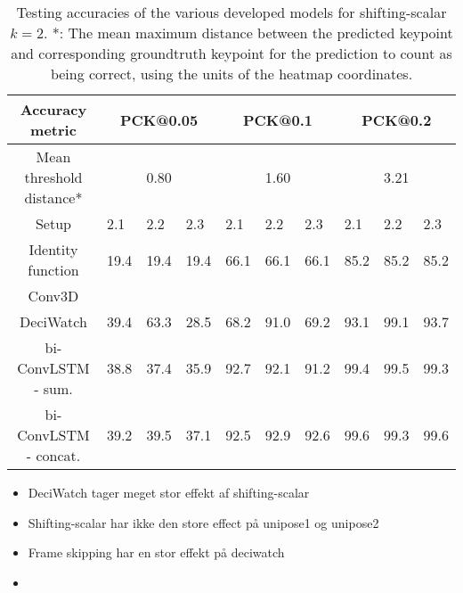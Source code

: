 \documentclass[./main.tex]{subfiles}
\begin{document}
\begin{table}[htbp]
    \begin{tabular}{c||lll|lll|lll}
        \hline
        Accuracy metric & \multicolumn{3}{c}{PCK@0.05} & \multicolumn{3}{c}{PCK@0.1} & \multicolumn{3}{c}{PCK@0.2} \\
        \hline
        Mean threshold distance* & \multicolumn{3}{c}{0.80} & \multicolumn{3}{c}{1.60} & \multicolumn{3}{c}{3.21} \\
        \hline
        Setup & 2.1 & 2.2 & 2.3 & 2.1 & 2.2 & 2.3 & 2.1 & 2.2 & 2.3 \\
        \hline
        \hline
        Identity function & 19.4 & 19.4 & 19.4 & 66.1 & 66.1 & 66.1 & 85.2 & 85.2 & 85.2 \\
        Conv3D & & & & & & & & & \\
        DeciWatch & 39.4 & 63.3 & 28.5 & 68.2 & 91.0 & 69.2 & 93.1 & 99.1 & 93.7 \\
        bi-ConvLSTM - sum. & 38.8 & 37.4 & 35.9 & 92.7 & 92.1 & 91.2 & 99.4 & 99.5 & 99.3 \\
        bi-ConvLSTM - concat. & 39.2 & 39.5 & 37.1 & 92.5 & 92.9 & 92.6 & 99.6 & 99.3 & 99.6 \\
        \hline
    \end{tabular}
    \caption{Testing accuracies of the various developed models for shifting-scalar $k = 2$. *: The mean maximum distance between the predicted keypoint and corresponding groundtruth keypoint for the prediction to count as being correct, using the units of the heatmap coordinates.}
    \label{tab:finetune_test_accs_2}
\end{table}

\begin{itemize}
    \item DeciWatch tager meget stor effekt af shifting-scalar
    \item Shifting-scalar har ikke den store effect på unipose1 og unipose2
    \item Frame skipping har en stor effekt på deciwatch
    \item 
\end{itemize}
\end{document}
